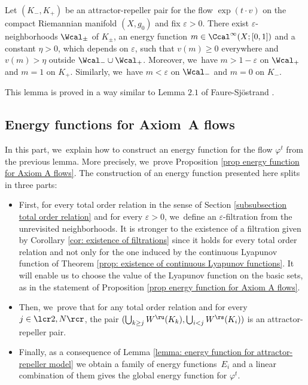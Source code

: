 \begin{lemma}\label{lemma: energy function for attractor-repeller model}
Let $(K_-,K_+)$ be an attractor-repeller pair for the flow $\exp (t\cdot v)$ on the compact Riemannian manifold $(X,g_0)$ and fix $\varepsilon > 0$. There exist $\varepsilon$-neighborhoods $\Wcal_{\pm}$ of $K_{\pm}$, an energy function $m \in \Ccal^{\infty} (X; [0,1])$ and a constant $\eta > 0$, which depends on $\varepsilon$, such that $v (m) \geq 0$ everywhere and $v (m) > \eta$ outside $\Wcal_{-} \cup \Wcal_{+}$. Moreover, we~have $m > 1 - \varepsilon$ on $\Wcal_{+}$ and $m = 1$ on $K_+$. Similarly, we~have $m < \varepsilon$ on $\Wcal_{-}$ and $m = 0$ on $K_-$.
\end{lemma}

This lemma is proved in a way similar to Lemma $2.1$ of Faure-Sjöstrand \cite[p.\,336]{FS}.

\subsection{Energy functions for Axiom~A flows}

In this part, we~explain how to construct an energy function for the flow $\varphi^t$ from the previous lemma. More precisely, we~prove Proposition \ref{prop energy function for Axiom A flows}. The construction of an energy function presented here splits in three parts:
\begin{itemize}
\item First, for every total order relation in the sense of Section \ref{subsubsection total order relation} and for every $\varepsilon > 0$, we~define an $\varepsilon$-filtration from the unrevisited neighborhoods. It is stronger to the existence of a filtration given by Corollary \ref{cor: existence of filtrations} since it holds for every total order relation and not only for the one induced by the continuous Lyapunov function of Theorem \ref{prop: existence of continuous Lyapunov functions}. It will enable us to choose the value of the Lyapunov function on the basic sets, as in the statement of Proposition \ref{prop energy function for Axiom A flows}.
\item Then, we~prove that for any total order relation and for every $j\in\lcr2,N\rcr$, the pair $(\bigcup_{k \geq j}W^\ru (K_k), \bigcup_{i < j}W^\rs (K_i))$ is an attractor-repeller pair.
\item Finally, as a consequence of Lemma \ref{lemma: energy function for attractor-repeller model} we obtain a family of energy functions~$E_i$ and a linear combination of them gives the global energy function for $\varphi^t$.
\end{itemize}

